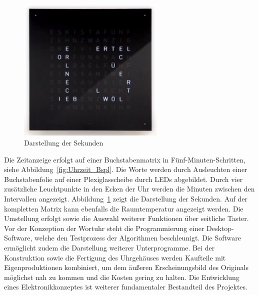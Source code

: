  \begin{figure}[t]
    \centering
    \includegraphics[width=7cm]{Abbildungen/Sekunden}
    \caption[Sekunden]{Darstellung der Sekunden}
    \label{fig:Sekunden}
\end{figure}
%
  \begin{multicols}{2}
Die Zeitanzeige erfolgt auf einer Buchstabenmatrix in Fünf-Minuten-Schritten, siehe Abbildung~\ref{fig:Uhrzeit_Bspl}. Die Worte werden durch Ausleuchten einer Buchstabenfolie auf einer Plexiglasscheibe durch LEDs abgebildet. Durch vier zusätzliche Leuchtpunkte in den Ecken der Uhr werden die Minuten zwischen den Intervallen angezeigt. Abbildung~\ref{fig:Sekunden} zeigt die Darstellung der Sekunden. Auf der kompletten Matrix kann ebenfalls die Raumtemperatur angezeigt werden. Die Umstellung erfolgt sowie die Auswahl weiterer Funktionen über seitliche Taster. Vor der Konzeption der Wortuhr steht die Programmierung einer Desktop-Software, welche den Testprozess der Algorithmen beschleunigt. Die Software ermöglicht zudem die Darstellung weiterer Unterprogramme.
Bei der Konstruktion sowie die Fertigung des Uhrgehäuses werden Kaufteile mit Eigenproduktionen kombiniert, um dem äußeren Erscheinungsbild des Originals möglichst nah zu kommen und die Kosten gering zu halten. Die Entwicklung eines Elektronikkonzeptes ist  weiterer fundamentaler Bestandteil des Projektes.
\end{multicols}



